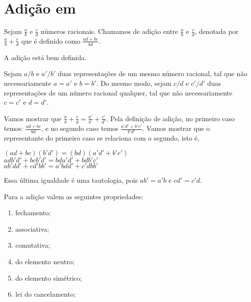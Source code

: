 \documentclass[../main.tex]{subfiles}
\begin{document}
\section{Adição em \Q}
\begin{defi}
    Sejam $\frac{a}{b}$ e $\frac{c}{d}$ números racionais. Chamamos de adição entre $\frac{a}{b}$ e $\frac{c}{d}$, denotada por $\frac{a}{b} + \frac{c}{d}$ que é definido como $\frac{ad+bc}{bd}$.
\end{defi}
\begin{prop}
    A adição está bem definida.
\end{prop}
\begin{dem}
    Sejam $a/b$ e $a'/b'$ duas representações de um mesmo número racional, tal que não necessariamente $a = a'$ e $b=b'$. Do mesmo modo, sejam $c/d$ e $c'/d'$ duas representações de um número racional qualquer, tal que não necessariamente $c=c'$ e $d=d'$.
    
    Vamos mostrar que $\frac{a}{b} + \frac{c}{d} = \frac{a'}{b'} + \frac{c'}{d'}$.
    Pela definição de adição, no primeiro caso temos: $\frac{ad+bc}{bd}$, e no segundo caso temos $\frac{a'd'+b'c'}{b'd'}$.
    Vamos mostrar que o representante do primeiro caso se relaciona com o segundo, isto é, 
    \begin{center}
        $(ad+bc)(b'd') = (bd)(a'd'+b'c')$ \\
        $adb'd'+bcb'd' = bda'd' + bdb'c'$ \\
        $ab'dd' + cd'bb' = a'bdd' + c'dbb'$
    \end{center}
    Essa última igualdade é uma tautologia, pois $ab' = a'b$ e $cd' = c'd$.
\end{dem}
\begin{prop}{Para a adição valem as seguintes propriedades:}
    \begin{enumerate}[label=(\roman*)]
        \item fechamento;
        \item associativa;
        \item comutativa;
        \item do elemento neutro; 
        \item do elemento simétrico;
        \item lei do cancelamento;
    \end{enumerate}
\end{prop}
\end{document}
